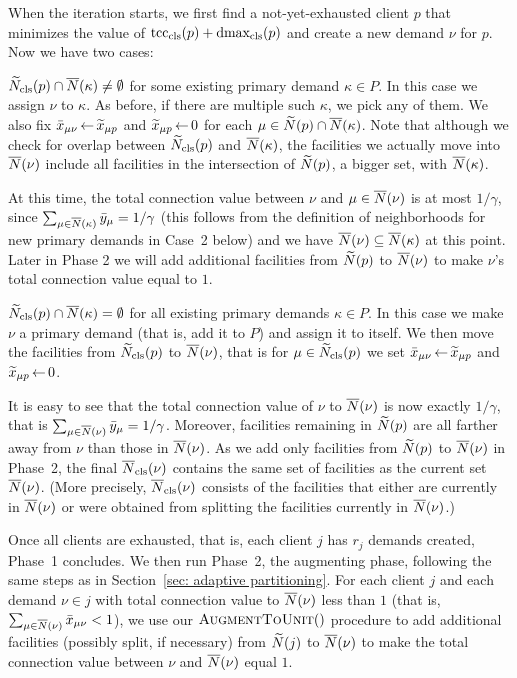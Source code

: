 \documentclass[oneside,final]{ucr}
\begin{document}
When the iteration starts, we first find a not-yet-exhausted client
$p$ that minimizes the value of $\mbox{\rm{tcc}}_{{\mbox{\scriptsize\rm cls}}}(p) + \mbox{\rm{dmax}}_{{\mbox{\scriptsize\rm cls}}}(p)$ and create
a new demand $\nu$ for $p$.  Now we have two cases:
%
\begin{description}
%
\item{} ${\widetilde N}_{{\mbox{\scriptsize\rm cls}}}(p) \cap {\overline{N}}(\kappa)\neq\emptyset$
  for some existing primary demand $\kappa\in P$.  In this case we
  assign $\nu$ to $\kappa$. As before, if there are multiple such
  $\kappa$, we pick any of them. We also fix ${\bar x}_{\mu \nu} {\,\leftarrow\,}
  {\widetilde x}_{\mu p}$ and ${\widetilde x}_{\mu p}{\,\leftarrow\,} 0$ for each $\mu \in
  {\widetilde N}(p)\cap {\overline{N}}(\kappa)$. Note that although we
  check for overlap between ${\widetilde N}_{{\mbox{\scriptsize\rm cls}}}(p)$ and ${\overline{N}}(\kappa)$,
  the facilities we actually move into ${\overline{N}}(\nu)$ include all
  facilities in the intersection of ${\widetilde N}(p)$, a bigger set, with
  ${\overline{N}}(\kappa)$.

  At this time, the total connection value 
	between $\nu$ and $\mu\in {\overline{N}}(\nu)$ is at most $1/\gamma$,
	 since $\sum_{\mu \in {\overline{N}}(\kappa)}{\bar y}_{\mu} = 1/\gamma$ 
	(this follows from the definition of neighborhoods for new primary demands in Case~2 below) 
	and  we have ${\overline{N}}(\nu) \subseteq {\overline{N}}(\kappa)$ at this point. Later
  in Phase 2 we will add additional facilities from ${\widetilde N}(p)$ to
  ${\overline{N}}(\nu)$ to make $\nu$'s total connection value equal to $1$.

%
\item{} ${\widetilde N}_{{\mbox{\scriptsize\rm cls}}}(p) \cap {\overline{N}}(\kappa) = \emptyset$
  for all existing primary demands $\kappa\in P$.  In this case we
  make $\nu$ a primary demand (that is, add it to $P$) and assign it
  to itself.  We then move the facilities from ${\widetilde N}_{{\mbox{\scriptsize\rm cls}}}(p)$ to
  ${\overline{N}}(\nu)$, that is for $\mu \in {\widetilde N}_{{\mbox{\scriptsize\rm cls}}}(p)$ we set
  ${\bar x}_{\mu \nu}{\,\leftarrow\,} {\widetilde x}_{\mu p}$ and ${\widetilde x}_{\mu p}\,{\leftarrow}\,
  0$.

  It is easy to see that the total connection value of $\nu$ to
  ${\overline{N}}(\nu)$ is now exactly $1/\gamma$, that is
	$\sum_{\mu \in {\overline{N}}(\nu)}{\bar y}_{\mu} = 1/\gamma$.
Moreover, facilities
  remaining in ${\widetilde N}(p)$ are all farther away from $\nu$ than
  those in ${\overline{N}}(\nu)$. As we add only facilities from ${\widetilde N}(p)$
  to ${\overline{N}}(\nu)$ in Phase~2, the final ${\overline{N}}_{{\mbox{\scriptsize\rm cls}}}(\nu)$ contains
  the same set of facilities as the current set ${\overline{N}}(\nu)$.
  (More precisely, ${\overline{N}}_{{\mbox{\scriptsize\rm cls}}}(\nu)$ consists of the facilities that
	either are currently in ${\overline{N}}(\nu)$ or were obtained from splitting
	the facilities currently in ${\overline{N}}(\nu)$.)
%
\end{description}
%
Once all clients are exhausted, that is, each client $j$ has $r_j$
demands created, Phase~1 concludes. We then run Phase~2, the
augmenting phase, following the same steps as in Section~\ref{sec:
  adaptive partitioning}.  For each client $j$ and each demand $\nu\in
j$ with total connection value to ${\overline{N}}(\nu)$ less than $1$
(that is, $\sum_{\mu\in{\overline{N}}(\nu)} {\bar x}_{\mu\nu} < 1$),
we use our ${\textsc{AugmentToUnit}}()$
procedure to add additional facilities (possibly split, if necessary)
from ${\widetilde N}(j)$ to ${\overline{N}}(\nu)$ to make the total connection value
between $\nu$ and ${\overline{N}}(\nu)$ equal $1$.
\end{document}
